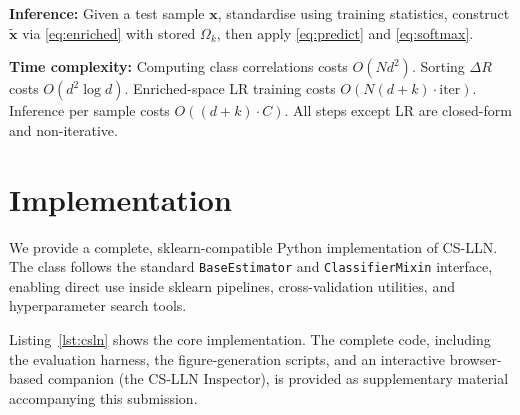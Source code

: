 \documentclass[conference]{IEEEtran}
\begin{document}
\noindent\textbf{Inference:}
Given a test sample $\mathbf{x}$, standardise using training statistics,
construct $\tilde{\mathbf{x}}$ via \eqref{eq:enriched} with stored $\Omega_k$,
then apply \eqref{eq:predict} and \eqref{eq:softmax}.

\noindent\textbf{Time complexity:}
Computing class correlations costs $O(N d^2)$.
Sorting $\Delta R$ costs $O(d^2 \log d)$.
Enriched-space LR training costs $O(N(d+k)\cdot\text{iter})$.
Inference per sample costs $O((d+k) \cdot C)$.
All steps except LR are closed-form and non-iterative.

\section{Implementation}
\label{sec:impl}

We provide a complete, sklearn-compatible Python implementation of CS-LLN.
The class follows the standard \texttt{BaseEstimator} and
\texttt{ClassifierMixin} interface, enabling direct use inside sklearn
pipelines, cross-validation utilities, and hyperparameter search tools.

Listing~\ref{lst:csln} shows the core implementation.
The complete code, including the evaluation harness, the figure-generation
scripts, and an interactive browser-based companion (the CS-LLN Inspector),
is provided as supplementary material accompanying this submission.
\end{document}
